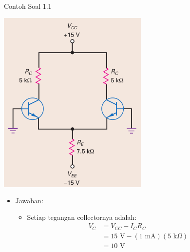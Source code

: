 \documentclass[aspectratio=169]{beamer}
\begin{document}
\begin{frame}{Contoh Soal 1.1}
	\begin{multicols}{2}
		\begin{center}
			\includegraphics[width=0.6\textheight]{gambar/01.latihan_soal_1a}
		\end{center}
		\columnbreak
		\begin{itemize}
			\item Jawaban:
			\begin{itemize}
				\item Setiap tegangan collectornya adalah:
				\begin{align*}
					V_C &= V_{CC} - I_C R_C \\
					&= 15 \text{ V} - (1 \text{ mA})(5 \text{ k}\Omega) \\
					&= 10 \text{ V}
				\end{align*}
				\[  \]
			\end{itemize}
		\end{itemize}
		\vfill\null
	\end{multicols}
\end{frame}
\end{document}
